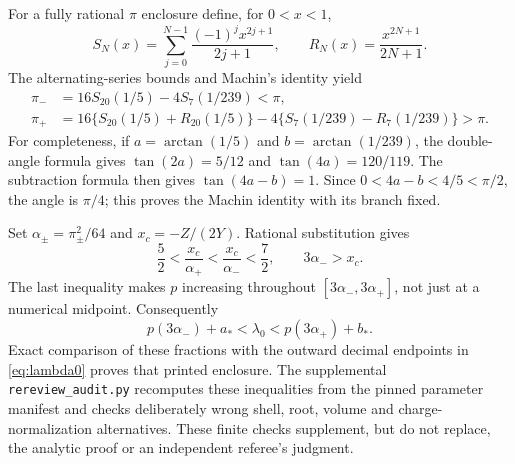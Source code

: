 \documentclass[11pt]{article}
\numberwithin{equation}{section}
\theoremstyle{definition}
\begin{document}
For a fully rational $\pi$ enclosure define, for $0<x<1$,
\begin{equation}
 S_N(x)=\sum_{j=0}^{N-1}\frac{(-1)^jx^{2j+1}}{2j+1},\qquad
 R_N(x)=\frac{x^{2N+1}}{2N+1}.
 \label{eq:arctan-certificate}
\end{equation}
The alternating-series bounds and Machin's identity yield
\begin{align}
 \pi_-&=16S_{20}(1/5)-4S_7(1/239)<\pi,\\
 \pi_+&=16\{S_{20}(1/5)+R_{20}(1/5)\}
       -4\{S_7(1/239)-R_7(1/239)\}>\pi.
 \label{eq:machin-certificate}
\end{align}
For completeness, if $a=\arctan(1/5)$ and $b=\arctan(1/239)$, the
double-angle formula gives $\tan(2a)=5/12$ and $\tan(4a)=120/119$.
The subtraction formula then gives $\tan(4a-b)=1$.
Since $0<4a-b<4/5<\pi/2$, the angle is $\pi/4$; this proves the
Machin identity with its branch fixed.

Set $\alpha_\pm=\pi_\pm^2/64$ and $x_c=-Z/(2Y)$.
Rational substitution gives
\begin{equation}
 \frac52<\frac{x_c}{\alpha_+}<\frac{x_c}{\alpha_-}<\frac72,
 \qquad 3\alpha_->x_c.
 \label{eq:shell-rational-certificate}
\end{equation}
The last inequality makes $p$ increasing throughout
$[3\alpha_-,3\alpha_+]$, not just at a numerical midpoint.  Consequently
\begin{equation}
 p(3\alpha_-)+a_*<\lambda_0<p(3\alpha_+)+b_*.
 \label{eq:lambda-rational-certificate}
\end{equation}
Exact comparison of these fractions with the outward decimal endpoints
in \eqref{eq:lambda0} proves that printed enclosure.  The supplemental
\texttt{rereview\_audit.py} recomputes these inequalities from the pinned
parameter manifest and checks deliberately wrong shell, root, volume and
charge-normalization alternatives.  These finite checks supplement, but
do not replace, the analytic proof or an independent referee's judgment.
\end{document}
